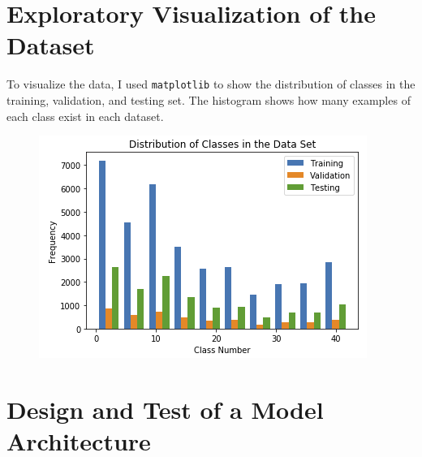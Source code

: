 \documentclass[12pt]{article}
\begin{document}
\section{Exploratory Visualization of the Dataset}
To visualize the data, I used \texttt{matplotlib} to show the distribution of classes in the training, validation, and testing set. The histogram shows how many examples of each class exist in each dataset.
\begin{figure}[h]
\centering
\includegraphics[scale=0.7]{writeup_images/distribution_classes.png}
\end{figure}

\section{Design and Test of a Model Architecture}
\end{document}
